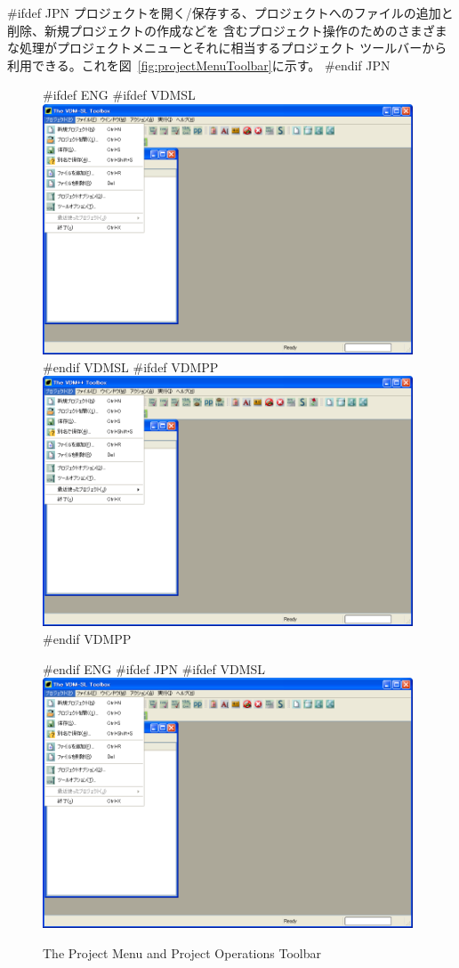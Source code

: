\documentclass[\pformat,12pt]{article}
\newcommand{\guicmd}[1]{{\sf #1}}
\newcommand{\guicmd}[1]{{\gt #1}}
\begin{document}
#ifdef JPN
プロジェクトを開く/保存する、プロジェクトへのファイルの追加と削除、新規プロジェクトの作成などを
含むプロジェクト操作のためのさまざまな処理が\guicmd{プロジェクト}メニューとそれに相当する\guicmd{プロジェクト}
ツールバーから利用できる。これを図~\ref{fig:projectMenuToolbar}に示す。
#endif JPN

\begin{figure}[tbh]
\begin{center}
\mbox{}
#ifdef ENG
#ifdef VDMSL
\includegraphics[width=11cm]{projectMenuToolbar-sl.png}
#endif VDMSL
#ifdef VDMPP
\includegraphics[width=11cm]{projectMenuToolbar-pp.png}
#endif VDMPP
\caption{The Project Menu and Project Operations Toolbar}
#endif ENG
#ifdef JPN
#ifdef VDMSL
\includegraphics[width=11cm]{projectMenuToolbar-sl.png}

\end{center}
\end{figure}
\end{document}
